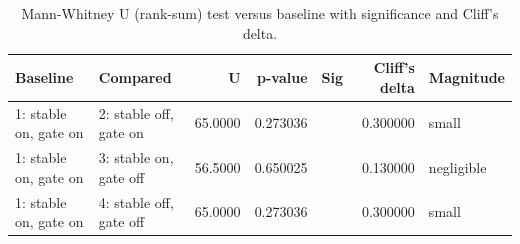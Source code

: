 \begin{table}[htbp]
\centering
\caption{Mann-Whitney U (rank-sum) test versus baseline with significance and Cliff's delta.}
\label{tab:wilcoxon_vs_baseline}
\begin{tabular}{llrrrrl}
\toprule
Baseline & Compared & U & p-value & Sig & Cliff's delta & Magnitude \\
\midrule
1: stable on, gate on & 2: stable off, gate on & 65.0000 & 0.273036 &  & 0.300000 & small \\
1: stable on, gate on & 3: stable on, gate off & 56.5000 & 0.650025 &  & 0.130000 & negligible \\
1: stable on, gate on & 4: stable off, gate off & 65.0000 & 0.273036 &  & 0.300000 & small \\
\bottomrule
\end{tabular}
\end{table}
